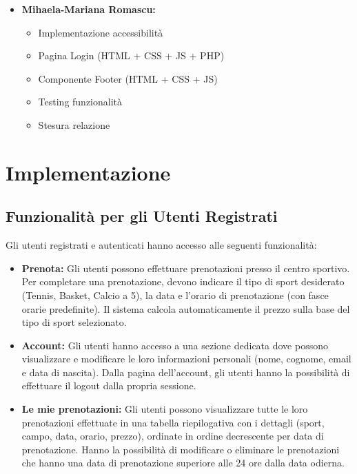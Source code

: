 \documentclass{article}
\begin{document}
\begin{itemize}
\begin{itemize}
        \item Stesura relazione
    \end{itemize}
    \item \textbf{Mihaela-Mariana Romascu:}
     \begin{itemize}
        \item Implementazione accessibilità
        \item Pagina Login (HTML + CSS + JS + PHP)
        \item Componente Footer (HTML + CSS + JS)
        \item Testing funzionalità
        \item Stesura relazione
    \end{itemize}
\end{itemize}

\section{Implementazione}

\subsection{Funzionalità per gli Utenti Registrati}

Gli utenti registrati e autenticati hanno accesso alle seguenti funzionalità:

\begin{itemize}
    \item \textbf{Prenota:} Gli utenti possono effettuare prenotazioni presso il centro sportivo. Per completare una prenotazione, devono indicare il tipo di sport desiderato (Tennis, Basket, Calcio a 5), la data e l'orario di prenotazione (con fasce orarie predefinite). Il sistema calcola automaticamente il prezzo sulla base del tipo di sport selezionato.
    
    \item \textbf{Account:} Gli utenti hanno accesso a una sezione dedicata dove possono visualizzare e modificare le loro informazioni personali (nome, cognome, email e data di nascita). Dalla pagina dell'account, gli utenti hanno la possibilità di effettuare il logout dalla propria sessione.
    
    \item \textbf{Le mie prenotazioni:} Gli utenti possono visualizzare tutte le loro prenotazioni effettuate in una tabella riepilogativa con i dettagli (sport, campo, data, orario, prezzo), ordinate in ordine decrescente per data di prenotazione. Hanno la possibilità di modificare o eliminare le prenotazioni che hanno una data di prenotazione superiore alle 24 ore dalla data odierna.
    


\end{itemize}
\end{document}
